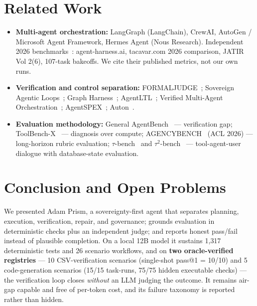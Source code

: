 \documentclass[11pt]{article}
\begin{document}
\section{Related Work}\label{sec:related}
\begin{itemize}
  \item \textbf{Multi-agent orchestration:} LangGraph (LangChain), CrewAI, AutoGen /
        Microsoft Agent Framework, Hermes Agent (Nous Research). Independent 2026
        benchmarks~\cite{bench2026}: agent-harness.ai, tacavar.com 2026 comparison, JATIR
        Vol 2(6), 107-task
        bakeoffs. We cite their published metrics, not our own runs.
  \item \textbf{Verification and control separation:} FORMALJUDGE~\cite{formajudge};
        Sovereign Agentic Loops~\cite{sovereign}; Graph Harness~\cite{graphhs};
        AgentLTL~\cite{agentltl}; Verified Multi-Agent Orchestration~\cite{vmao};
        AgentSPEX~\cite{agentspex}; Auton~\cite{auton}.
  \item \textbf{Evaluation methodology:} General AgentBench~\cite{gentbench} ---
        verification gap; ToolBench-X~\cite{toolbenchx} --- diagnosis over compute;
        AGENCYBENCH~\cite{agencyb} (ACL 2026) --- long-horizon rubric evaluation;
        $\tau$-bench~\cite{tau} and $\tau^2$-bench~\cite{tau2} --- tool-agent-user dialogue
        with database-state evaluation.
\end{itemize}

\section{Conclusion and Open Problems}\label{sec:conclusion}
We presented Adam Prism, a sovereignty-first agent that separates planning, execution,
verification, repair, and governance; grounds evaluation in deterministic checks plus an
independent judge; and reports honest pass/fail instead of plausible completion. On a
local 12B model it sustains 1{,}317 deterministic tests and 26 scenario workflows, and on
\textbf{two oracle-verified registries} --- 10 CSV-verification scenarios (single-shot
pass@1 = 10/10) and 5 code-generation scenarios (15/15 task-runs, 75/75 hidden executable
checks) --- the verification loop closes \emph{without} an LLM judging the outcome. It
remains air-gap capable and free of per-token cost, and its failure taxonomy is reported
rather than hidden.
\end{document}
